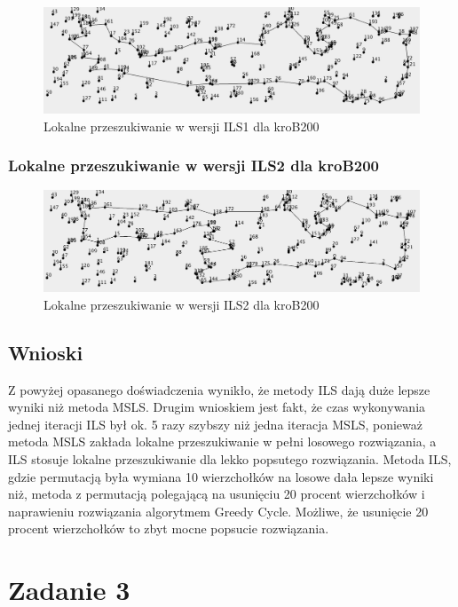 \documentclass[a4paper]{article}
\begin{document}
\begin{figure}[H]
\centering
\includegraphics[width=\textwidth]{lab4/kroB_ILS1.png}
\caption{Lokalne przeszukiwanie w wersji ILS1 dla kroB200}
\end{figure}

\subsubsection{Lokalne przeszukiwanie w wersji ILS2 dla kroB200}

\begin{figure}[H]
\centering
\includegraphics[width=\textwidth]{lab4/kroB_ILS2.png}
\caption{Lokalne przeszukiwanie w wersji ILS2 dla kroB200}
\end{figure}

\subsection{Wnioski}

Z powyżej opasanego doświadczenia wynikło, że metody ILS dają duże lepsze wyniki niż metoda MSLS. Drugim wnioskiem jest fakt, że czas wykonywania jednej iteracji ILS był ok. 5 razy szybszy niż jedna iteracja MSLS, ponieważ metoda MSLS zakłada lokalne przeszukiwanie w pełni losowego rozwiązania, a ILS stosuje lokalne przeszukiwanie dla lekko popsutego rozwiązania. Metoda ILS, gdzie permutacją była wymiana 10 wierzchołków na losowe dała lepsze wyniki niż, metoda z permutacją polegającą na usunięciu 20 procent wierzchołków i naprawieniu rozwiązania algorytmem Greedy Cycle. Możliwe, że usunięcie 20 procent wierzchołków to zbyt mocne popsucie rozwiązania.

\section{Zadanie 3}
\end{document}
